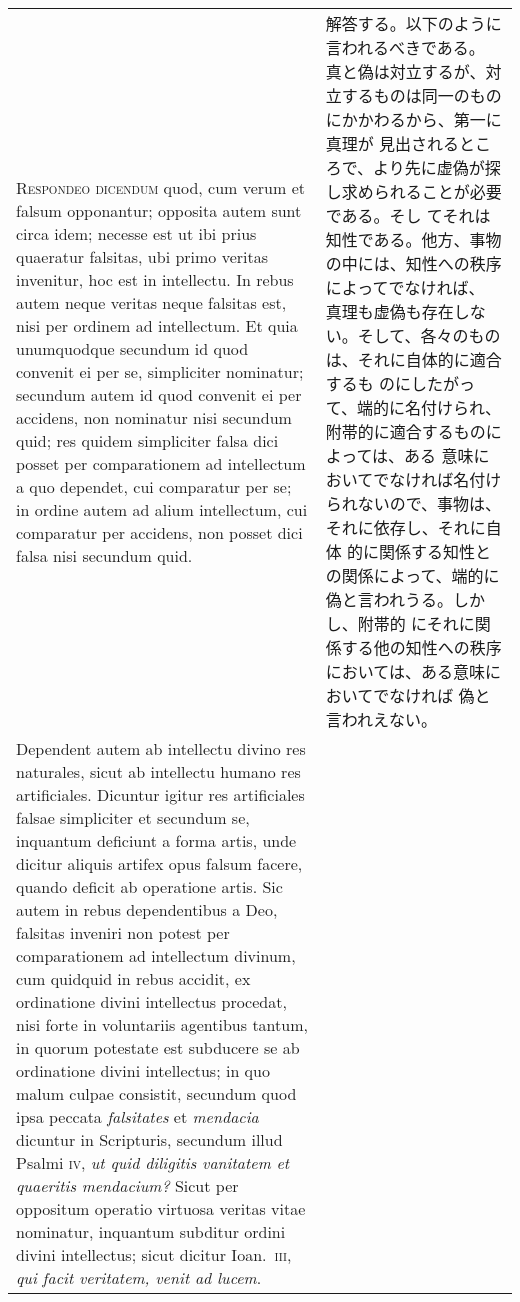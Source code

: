\documentclass[paper=a4paper,fontsize=10pt,jafontsize=9pt,titlepage]{jlreq}
\begin{document}
\begin{longtable}{p{21em}p{21em}}
\\


{\scshape Respondeo dicendum} quod, cum verum et falsum
opponantur; opposita autem sunt circa idem; necesse est ut ibi prius
quaeratur falsitas, ubi primo veritas invenitur, hoc est in
intellectu. In rebus autem neque veritas neque falsitas est, nisi per
ordinem ad intellectum. Et quia unumquodque secundum id quod convenit ei
per se, simpliciter nominatur; secundum autem id quod convenit ei per
accidens, non nominatur nisi secundum quid; res quidem simpliciter falsa
dici posset per comparationem ad intellectum a quo dependet, cui
comparatur per se; in ordine autem ad alium intellectum, cui comparatur
per accidens, non posset dici falsa nisi secundum quid. 


&


解答する。以下のように言われるべきである。
真と偽は対立するが、対立するものは同一のものにかかわるから、第一に真理が
 見出されるところで、より先に虚偽が探し求められることが必要である。そし
 てそれは知性である。他方、事物の中には、知性への秩序によってでなければ、
 真理も虚偽も存在しない。そして、各々のものは、それに自体的に適合するも
 のにしたがって、端的に名付けられ、附帯的に適合するものによっては、ある
 意味においてでなければ名付けられないので、事物は、それに依存し、それに自体
 的に関係する知性との関係によって、端的に偽と言われうる。しかし、附帯的
 にそれに関係する他の知性への秩序においては、ある意味においてでなければ
 偽と言われえない。

\\



Dependent autem
ab intellectu divino res naturales, sicut ab intellectu humano res
artificiales. Dicuntur igitur res artificiales falsae simpliciter et
secundum se, inquantum deficiunt a forma artis, unde dicitur aliquis
artifex opus falsum facere, quando deficit ab operatione artis. Sic
autem in rebus dependentibus a Deo, falsitas inveniri non potest per
comparationem ad intellectum divinum, cum quidquid in rebus accidit, ex
ordinatione divini intellectus procedat, nisi forte in voluntariis
agentibus tantum, in quorum potestate est subducere se ab ordinatione
divini intellectus; in quo malum culpae consistit, secundum quod ipsa
peccata {\itshape falsitates} et {\itshape mendacia} dicuntur in Scripturis, secundum illud
Psalmi {\scshape iv}, {\itshape ut quid diligitis vanitatem et quaeritis mendacium?} Sicut per
oppositum operatio virtuosa veritas vitae nominatur, inquantum subditur
ordini divini intellectus; sicut dicitur Ioan.~{\scshape iii}, {\itshape qui facit veritatem,
venit ad lucem}. 




\end{longtable}
\end{document}
